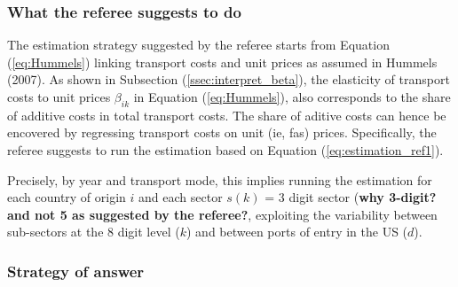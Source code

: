 \documentclass[a4paper,12pt]{article}
\begin{document}
\subsubsection{What the referee suggests to do}

The estimation strategy suggested by the referee starts from Equation (\ref{eq:Hummels}) linking transport costs and unit prices as assumed in Hummels (2007). As shown in Subsection (\ref{ssec:interpret_beta}), the elasticity of transport costs to unit prices $\beta_{ik}$ in Equation (\ref{eq:Hummels}), also corresponds to the share of additive costs in total transport costs. The share of aditive costs can hence be encovered by regressing transport costs on unit (ie, fas) prices. Specifically, the referee suggests to run the estimation based on Equation (\ref{eq:estimation_ref1}).

Precisely, by year and transport mode, this implies running the estimation for each country of origin $i$ and each sector $s(k)$ = 3 digit sector (\textbf{why 3-digit? and not 5 as suggested by the referee?}, exploiting the variability between sub-sectors at the 8 digit level ($k$) and between ports of entry in the US ($d$).

\subsubsection{Strategy of answer}
\end{document}
